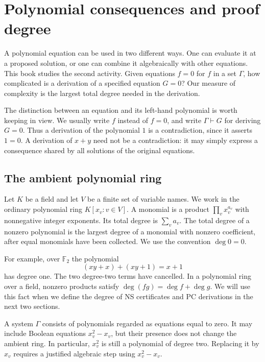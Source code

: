 \chapter{Polynomial consequences and proof degree}\label{tx:ch:consequences}
A polynomial equation can be used in two different ways. One can evaluate
it at a proposed solution, or one can combine it algebraically with other
equations. This book studies the second activity. Given equations
$f=0$ for $f$ in a set $\Gamma$, how complicated is a derivation of a
specified equation $G=0$? Our measure of complexity is the largest total
degree needed in the derivation.

The distinction between an equation and its left-hand polynomial is
worth keeping in view. We usually write $f$ instead of $f=0$, and write
$\Gamma\vdash G$ for deriving $G=0$. Thus a derivation of the polynomial
$1$ is a contradiction, since it asserts $1=0$. A derivation of $x+y$
need not be a contradiction: it may simply express a consequence shared
by all solutions of the original equations.

\section{The ambient polynomial ring}
Let $K$ be a field and let $V$ be a finite set of variable names. We work
in the ordinary polynomial ring $K[x_v:v\in V]$. A monomial is a product
$\prod_vx_v^{a_v}$ with nonnegative integer exponents. Its total degree
is $\sum_va_v$. The total degree of a nonzero polynomial is the largest
degree of a monomial with nonzero coefficient, after equal monomials
have been collected. We use the convention $\deg0=0$.

For example, over $\mathbb F_2$ the polynomial
\[
                   (xy+x)+(xy+1)=x+1
\]
has degree one. The two degree-two terms have cancelled. In a polynomial
ring over a field, nonzero products satisfy
$\deg(fg)=\deg f+\deg g$. We will use this fact when we define the
degree of NS certificates and PC derivations in the next two sections.

A system $\Gamma$ consists of polynomials regarded as equations equal
to zero. It may include Boolean equations $x_v^2-x_v$, but their presence
does not change the ambient ring. In particular, $x_v^2$ is still a
polynomial of degree two. Replacing it by $x_v$ requires a justified
algebraic step using $x_v^2-x_v$.

